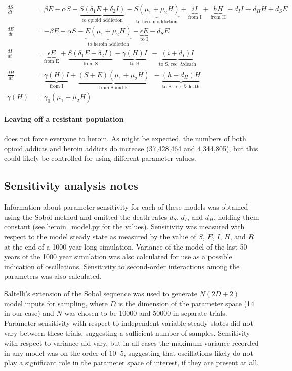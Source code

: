 \documentclass[11pt]{report}
\begin{document}
\begin{align*}
\frac{dS}{dt} &= \beta E - \alpha S - \underbrace{S(\delta_1 E + \delta_2 I)}_{\text{to opioid addiction}} - \underbrace{S(\mu_1+\mu_2H)}_{\text{to heroin addiction}} 
+ \underbrace{iI}_{\text{from I}} + \underbrace{hH}_{\text{from H}} 
+ d_I I + d_H H + d_S E\\
\frac{dE}{dt} &= - \beta E + \alpha S - \underbrace{E(\mu_1 + \mu_2H)}_{\text{to heroin addiction}} - \underbrace{\epsilon E}_{\text{to I}} - d_S E\\
\frac{dI}{dt} &= \underbrace{\epsilon E}_{\text{from E}} + \underbrace{S(\delta_1E+\delta_2I)}_{\text{from S}} - \underbrace{\gamma(H)I}_{\text{to H}}\ \ 
- \underbrace{(i+d_I)I}_{\text{to S, rec. \& death}}\\
\frac{dH}{dt} &= \underbrace{\gamma(H)I}_{\text{from I}} + \underbrace{(S+E)(\mu_1+\mu_2H)}_{\text{from S and E}}\ \ - \underbrace{(h+d_H)H}_{\text{to S, rec. \& death}}\\
\gamma(H) &= \gamma_0(\mu_1+\mu_2H)
\end{align*}

\paragraph{Leaving off a resistant population} does not force everyone to heroin. As might be expected, the numbers of both opioid addicts and heroin addicts do increase (37,428,464 and 4,344,805), but this could likely be controlled for using different parameter values.

\subsection*{Sensitivity analysis notes}

Information about parameter sensitivity for each of these models was obtained using the Sobol method and omitted the death rates $d_S$, $d_I$, and $d_H$, holding them constant (see heroin\_model.py for the values). Sensitivity was measured with respect to the model steady state as measured by the value of $S$, $E$, $I$, $H$, and $R$ at the end of a 1000 year long simulation. Variance of the model of the last 50 years of the 1000 year simulation was also calculated for use as a possible indication of oscillations. Sensitivity to second-order interactions among the parameters was also calculated.

Saltelli's extension of the Sobol sequence was used to generate $N(2D+2)$ model inputs for sampling, where $D$ is the dimension of the parameter space (14 in our case) and $N$ was chosen to be 10000 and 50000 in separate trials. Parameter sensitivity with respect to independent variable steady states did not vary between these trials, suggesting a sufficient number of samples. Sensitivity with respect to variance did vary, but in all cases the maximum variance recorded in any model was on the order of $10^-5$, suggesting that oscillations likely do not play a significant role in the parameter space of interest, if they are present at all.
\end{document}
